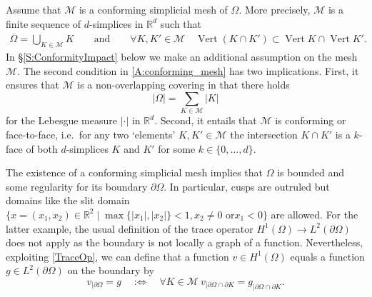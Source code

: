 \documentclass[a4paper]{amsart}
\numberwithin{equation}{section}
\theoremstyle{plain}
\theoremstyle{definition}
\begin{document}
Assume that ${\mathcal{M}}$ is a conforming simplicial mesh of $\Omega$.  More
precisely, ${\mathcal{M}}$ is a finite sequence of $d$-simplices in ${{\mathbb{R}}^d}$ such
that
\begin{gather}
\label{A:conforming_mesh}
 \overline\Omega = \bigcup_{{K}\in{\mathcal{M}}} {K}
\qquad\text{and}\qquad
 \forall {K},{K}'\in{\mathcal{M}}
\quad
 \operatorname{Vert} ({K}\cap{K}') \subset \operatorname{Vert}{K} \cap \operatorname{Vert}{K}'.
\end{gather}
In \S\ref{S:ConformityImpact} below we make an additional
assumption on the mesh ${\mathcal{M}}$.  The second condition in
\eqref{A:conforming_mesh} has two implications.  First, it ensures
that ${\mathcal{M}}$ is a non-overlapping covering in that there holds
\[
 {\left|{\Omega}\right|}
 =
 \sum_{{K}\in{\mathcal{M}}} {\left|{K}\right|}
\]
for the Lebesgue measure ${\left|{\cdot}\right|}$ in ${{\mathbb{R}}^d}$.  Second, it entails
that ${\mathcal{M}}$ is conforming or face-to-face, i.e.\ for any two
`elements' ${K},{K}'\in{\mathcal{M}}$ the intersection ${K}\cap{K}'$ is a
$k$-face of both $d$-simplices ${K}$ and ${K}'$ for some
$k\in\{0,\dots,d\}$. 

The existence of a conforming simplicial mesh implies that $\Omega$ is
bounded and some regularity for its boundary $\partial\Omega$.  In
particular, cusps are outruled but domains like the slit domain
$\{x=(x_1,x_2)\in{\mathbb{R}}^2\mid \max\{|x_1|,|x_2|\}<1, x_2 \neq 0 \text{ or
} x_1<0 \}$ are allowed.  For the latter example, the usual definition
of the trace operator ${H^{{1}}}(\Omega)\to{L^{{2}}}(\partial\Omega)$ does
not apply as the boundary is not locally a graph of a function.
Nevertheless, exploiting \eqref{TraceOp}, we can define that a 
function $v\in{H^{{1}}}(\Omega)$ equals a function $g\in{L^{2}}(\partial\Omega)$ on 
the boundary by
\[
 v_{|\partial\Omega}=g
\quad\text{:$\iff$}\quad
 \forall{K}\in{\mathcal{M}}\ v_{|\partial\Omega\cap\partial{K}} = 
   g_{|\partial\Omega\cap\partial{K}}.
\]
\end{document}
